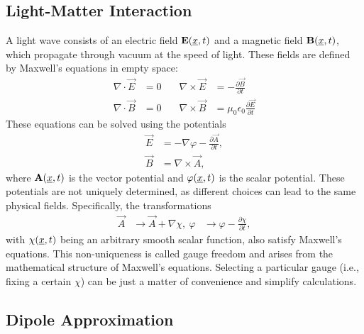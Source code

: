 \subsection{Light-Matter Interaction}
A light wave consists of an electric field $\mathbf{E}(\underline{x},t)$ and a magnetic field $\mathbf{B}(\underline{x},t)$, which propagate through vacuum at the speed of light. 
These fields are defined by Maxwell's equations in empty space:
\begin{equation*}
    \begin{aligned}
        \nabla \cdot \vec{E} &= 0 \quad & \nabla \times \vec{E} &= -\frac{\partial \vec{B}}{\partial t} \\
        \nabla \cdot \vec{B} &= 0 \quad & \nabla \times \vec{B} &= \mu_0\epsilon_0 \frac{\partial \vec{E}}{\partial t}
    \end{aligned}
\end{equation*}
These equations can be solved using the potentials
\begin{equation}
    \begin{aligned}
        \vec{E} &= -\nabla \varphi - \frac{\partial \vec{A}}{\partial t}, \\ \label{eq:potentials}
        \vec{B} &= \nabla \times \vec{A},
    \end{aligned}
\end{equation}
where $\mathbf{A}(\underline{x}, t)$ is the vector potential and $\varphi(\underline{x}, t)$ is the scalar potential. 
These potentials are not uniquely determined, as different choices can lead to the same physical fields. 
Specifically, the transformations
\begin{equation}
    \begin{aligned}
        \vec{A} &\to \vec{A} + \nabla \chi, \
        \varphi &\to \varphi - \frac{\partial \chi}{\partial t},
    \end{aligned}
\end{equation}
with $\chi(\underline{x}, t)$ being an arbitrary smooth scalar function, also satisfy Maxwell's equations. 
This non-uniqueness is called gauge freedom and arises from the mathematical structure of Maxwell's equations.
Selecting a particular gauge (i.e., fixing a certain $\chi$) can be just a matter of convenience and simplify calculations.

\subsection{Dipole Approximation}

